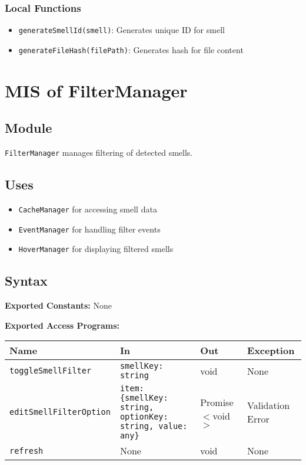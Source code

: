 \documentclass[12pt, titlepage]{article}
\begin{document}
\subsubsection{Local Functions}
\begin{itemize}
\item \texttt{generateSmellId(smell)}: Generates unique ID for smell
\item \texttt{generateFileHash(filePath)}: Generates hash for file content
\end{itemize}

\section{MIS of FilterManager}

\subsection{Module}
\texttt{FilterManager} manages filtering of detected smells.

\subsection{Uses}
\begin{itemize}
\item \texttt{CacheManager} for accessing smell data
\item \texttt{EventManager} for handling filter events
\item \texttt{HoverManager} for displaying filtered smells
\end{itemize}

\subsection{Syntax}

\textbf{Exported Constants:} None

\textbf{Exported Access Programs:}\\
\begin{tabularx}{\linewidth}{|l|>{\raggedright\arraybackslash}X|l|l|}
  \hline
  \textbf{Name} & \textbf{In} & \textbf{Out} & \textbf{Exception} \\
  \hline
  \texttt{toggleSmellFilter} & \texttt{smellKey: string} & void & None \\ \hline
  \texttt{editSmellFilterOption} & \texttt{item: \{smellKey: string, optionKey: string, value: any\}} & Promise$<$void$>$ & Validation Error \\ \hline
  \texttt{refresh} & None & void & None \\
  \hline
\end{tabularx}
\end{document}
